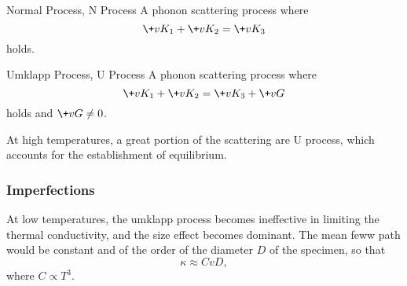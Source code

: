 \documentclass[hidelinks]{article}
\begin{document}
\begin{termdef}{Normal Process, N Process}
    A phonon scattering process where
    \[ \+vK_1 + \+vK_2 = \+vK_3 \]
    holds.
\end{termdef}
\begin{termdef}{Umklapp Process, U Process}
    A phonon scattering process where
    \[ \+vK_1 + \+vK_2 = \+vK_3 + \+vG \]
    holds and $\+vG \neq 0$.
\end{termdef}
At high temperatures, a great portion of the scattering are U process, which accounts for the establishment of equilibrium.


\subsubsection{Imperfections} %
\label{ssub:imperfections}

At low temperatures, the umklapp process becomes ineffective in limiting the thermal conductivity, and the size effect becomes dominant. The mean feww path would be constant and of the order of the diameter $D$ of the specimen, so that
\[ \kappa \approx CvD, \]
where $C \propto T^3$.



\end{document}
